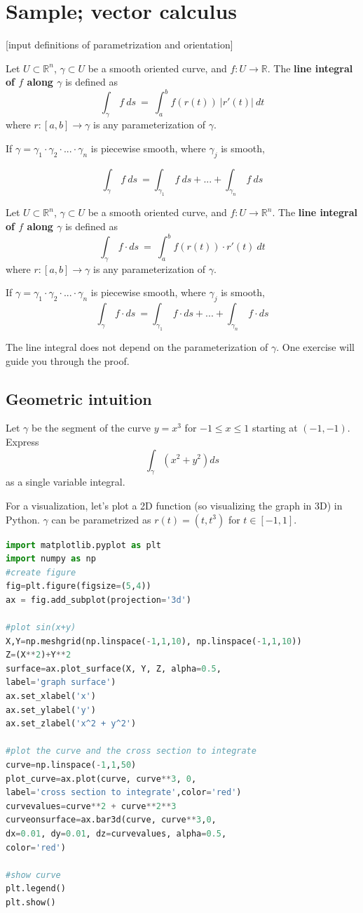 \documentclass[11pt,openany]{book}
\newcommand{\definition}[2]{\begin{tcolorbox}[title=Definition ({#1}),colframe=black]{#2}\end{tcolorbox}
}
\newcommand{\example}[1]{\begin{tcolorbox}[title=Example,colframe=yellow!50!white,colback=yellow!20!white,coltitle=black]{#1}\end{tcolorbox}
}
\begin{document}
	
	\chapter{Sample; vector calculus}
	
	[input definitions of parametrization and orientation]
	\definition{Line Integral; scalar}{
		Let $U \subset \mathbb{R}^n$, $\gamma \subset U$ be a smooth oriented curve, and $f: U \to \mathbb{R}$. The \textbf{line integral of $f$ along $\gamma$} is defined as
		\[
		\int_\gamma \ f \ ds \ = \ \int_a^b f(r(t)) \ |r'(t)| \ dt
		\]
		where $r : [a,b] \to \gamma$ is any parameterization of $\gamma$.

		If $\gamma =  \gamma_1 \cdot \gamma_2 \cdot ... \cdot \gamma_n  $ is piecewise smooth, where $\gamma_j$ is smooth,

		\[
		\int_\gamma \ f \ ds \ = \int_{\gamma_1} \ f \ ds + ... + \int_{\gamma_n} \ f \ ds
		\]
	}
	\definition{Line Integral; vector}{
		Let $U \subset \mathbb{R}^n$, $\gamma \subset U$ be a smooth oriented curve, and $f: U \to \mathbb{R}^n$. The \textbf{line integral of $f$ along $\gamma$} is defined as
		\[
		\int_\gamma \ f  \cdot ds \ = \ \int_a^b f(r(t)) \cdot r'(t)  \ dt
		\]
		where $r : [a,b] \to \gamma$ is any parameterization of $\gamma$.

		If $\gamma =  \gamma_1 \cdot \gamma_2 \cdot ... \cdot \gamma_n  $ is piecewise smooth, where $\gamma_j$ is smooth,
		\[
		\int_\gamma \ f \cdot ds \ = \int_{\gamma_1} \ f \cdot ds + ... + \int_{\gamma_n} \ f \cdot ds
		\]
	}

	The line integral does not depend on the parameterization of $\gamma$. One exercise will guide you through the proof.
	\section*{Geometric intuition}
	\example{
		Let $\gamma$ be the segment of the curve $y=x^3$ for $-1\leq x\leq 1$ starting at $(-1,-1)$.
		Express 
		\[
		\int_{\gamma} (x^2 +y^2) ds
		\]
		as a single variable integral.
	}
	For a visualization, let's plot a 2D function (so visualizing the graph in 3D) in Python. $\gamma$ can be parametrized as $r(t) = (t,t^3)$ for $t\in[-1,1]$.
	\begin{lstlisting}[language=Python]
import matplotlib.pyplot as plt
import numpy as np
#create figure
fig=plt.figure(figsize=(5,4))
ax = fig.add_subplot(projection='3d')

#plot sin(x+y)
X,Y=np.meshgrid(np.linspace(-1,1,10), np.linspace(-1,1,10))
Z=(X**2)+Y**2
surface=ax.plot_surface(X, Y, Z, alpha=0.5,
label='graph surface')
ax.set_xlabel('x')
ax.set_ylabel('y')
ax.set_zlabel('x^2 + y^2')

#plot the curve and the cross section to integrate
curve=np.linspace(-1,1,50)
plot_curve=ax.plot(curve, curve**3, 0,
label='cross section to integrate',color='red')
curvevalues=curve**2 + curve**2**3
curveonsurface=ax.bar3d(curve, curve**3,0,
dx=0.01, dy=0.01, dz=curvevalues, alpha=0.5,
color='red')

#show curve
plt.legend()
plt.show()
	\end{lstlisting}
\end{document}
